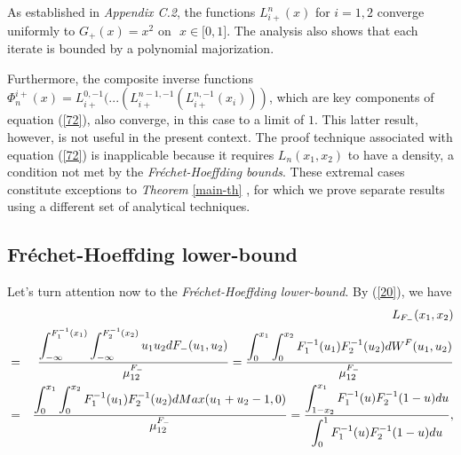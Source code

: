 \documentclass[onecolumn]{article}
\providecommand{\dint}{\displaystyle\int}
\renewcommand{\dint}{\displaystyle\int}
\begin{document}
As established in \textit{Appendix C.2}, the functions $L_{i+}^{n}(x)$ for $%
i=1,2$ converge uniformly to $G_{+}(x)=x^{2}$ on$\,$\ $x\in \lbrack 0,1]$.
The analysis also shows that each iterate is bounded by a polynomial
majorization.

Furthermore, the composite inverse functions $\Phi
_{n}^{i+}(x)=L_{i+}^{0,-1}(...(L_{i+}^{n-1,-1}(L_{i+}^{n,-1}(x_{i})))$,
which are key components of equation (\ref{72}), also converge, in this case
to a limit of $1$. This latter result, however, is not useful in the present
context. The proof technique associated with equation (\ref{72}) is
inapplicable because it requires $L_{n}(x_{1},x_{2})$ to have a density, a
condition not met by the \textit{Fr\'{e}chet-Hoeffding} \textit{bounds}.
These extremal cases constitute exceptions to \textit{Theorem} \ref{main-th}%
, for which we prove separate results using a different set of analytical
techniques.

\subsection{Fr\'{e}chet-Hoeffding lower-bound}

Let's turn attention now to the \textit{Fr\'{e}chet-Hoeffding lower-bound}.
By (\ref{20}), we have%
\begin{eqnarray}
&&L_{F_{-}}(x_{1},x_{2})  \notag \\
&=&\frac{\dint\nolimits_{-\infty
}^{F_{1}^{-1}(x_{1})}\dint\nolimits_{-\infty
}^{F_{2}^{-1}(x_{2})}u_{1}u_{2}dF_{-}(u_{1},u_{2})}{\mu _{12}^{F_{-}}}=\frac{%
\dint\nolimits_{0}^{x_{1}}\dint%
\nolimits_{0}^{x_{2}}F_{1}^{-1}(u_{1})F_{2}^{-1}(u_{2})dW^{F}(u_{1},u_{2})}{%
\mu _{12}^{F_{-}}}  \notag \\
&=&\frac{\dint\nolimits_{0}^{x_{1}}\dint%
\nolimits_{0}^{x_{2}}F_{1}^{-1}(u_{1})F_{2}^{-1}(u_{2})dMax(u_{1}+u_{2}-1,0)%
}{\mu _{12}^{F_{-}}}=\frac{\dint%
\nolimits_{1-x_{2}}^{x_{1}}F_{1}^{-1}(u)F_{2}^{-1}(1-u)du}{%
\dint\nolimits_{0}^{1}F_{1}^{-1}(u)F_{2}^{-1}(1-u)du},  \label{30}
\end{eqnarray}
\end{document}
